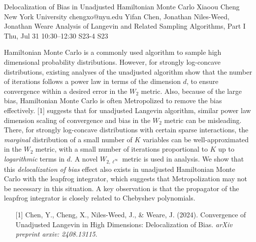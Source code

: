 \begin{talk}
  {Delocalization of Bias in Unadjusted Hamiltonian Monte Carlo}%
  {Xiaoou Cheng}%
  {New York University}%
  {chengxo@nyu.edu}%
  {Yifan Chen, Jonathan Niles-Weed, Jonathan Weare}%
  {Analysis of Langevin and Related Sampling Algorithms, Part I}%
  {Thu, Jul 31 10:30–12:30}%
  {S23-4}%
  {S23}%
				
			
Hamiltonian Monte Carlo is a commonly used algorithm to sample high dimensional probability distributions. However, for strongly log-concave distributions, existing analyses of the unadjusted algorithm show that the number of iterations follows a power law in terms of the dimension $d$, to ensure convergence within a desired error in the $W_2$ metric. Also, because of the large bias, Hamiltonian Monte Carlo is often Metropolized to remove the bias effectively. [1] suggests that for unadjusted Langevin algorithm, similar power law dimension scaling of convergence and bias in the $W_2$ metric can be misleading. There, for strongly log-concave distributions with certain sparse interactions, the \emph{marginal} distribution of a small number of $K$ variables can be well-approximated in the $W_2$ metric, with a small number of iterations proportional to $K$ up to \emph{logarithmic} terms in $d$. A novel $W_{2,\ell^\infty}$ metric is used in analysis. We show that this \emph{delocalization of bias} effect also exists in unadjusted Hamiltonian Monte Carlo with the leapfrog integrator, which suggests that Metropolization may not be necessary in this situation. A key observation is that the propagator of the leapfrog integrator is closely related to Chebyshev polynomials.

\medskip

\begin{enumerate}
	\item[{[1]}] Chen, Y., Cheng, X., Niles-Weed, J., \& Weare, J. (2024). Convergence of Unadjusted Langevin in High Dimensions: Delocalization of Bias. \textit{arXiv preprint arxiv: 2408.13115}.
\end{enumerate}

\end{talk}


